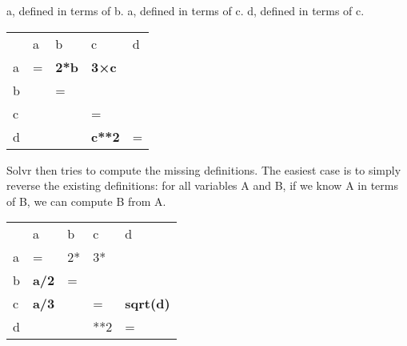 \documentclass[11pt]{article}
\begin{document}
a, defined in terms of b.
a, defined in terms of c.
d, defined in terms of c.

\begin{center}
\begin{tabular}{lllll}
 & a & b & c & d\\
a & = & \textbf{2*b} & \textbf{3×c} & \\
b &  & = &  & \\
c &  &  & = & \\
d &  &  & \textbf{c**2} & =\\
\end{tabular}
\end{center}

Solvr then tries to compute the missing definitions.  The easiest
case is to simply reverse the existing definitions: for all
variables A and B, if we know A in terms of B, we can compute B
from A.

\begin{center}
\begin{tabular}{lllll}
 & a & b & c & d\\
a & = & 2* & 3* & \\
b & \textbf{a/2} & = &  & \\
c & \textbf{a/3} &  & = & \textbf{sqrt(d)}\\
d &  &  & **2 & =\\
\end{tabular}
\end{center}
\end{document}
